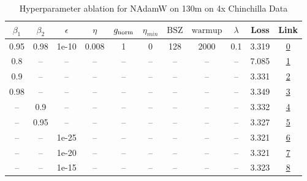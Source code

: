 \begin{table}[H]
\centering
\caption{Hyperparameter ablation for NAdamW on 130m on 4x Chinchilla Data}
\label{tab:ablation_nadamw_130m_on_4x_chinchilla_data}
\begin{tabular}{ccccccccccc}
\toprule
$\beta_1$ & $\beta_2$ & $\epsilon$ & $\eta$ & $g_{\mathrm{norm}}$ & $\eta_{min}$ & $\mathrm{BSZ}$ & $\mathrm{warmup}$ & $\lambda$ & Loss & Link \\
\midrule
0.95 & 0.98 & 1e-10 & 0.008 & 1 & 0 & 128 & 2000 & 0.1 & 3.319 & \href{https://wandb.ai/marin-community/optimizer-scaling/runs/sweep-130m-10B-nadamwaee88elr0.008-wd0.1-minlr0-warmup2000-b10.9-75fe1d}{0} \\
\midrule
0.8 & -- & -- & -- & -- & -- & -- & -- & -- & 7.085 & \href{https://wandb.ai/marin-community/optimizer-scaling/runs/sweep-130m-10B-nadamw3ae24elr0.008-wd0.1-minlr0-warmup2000-b10.8-cd4bbc}{1} \\
0.9 & -- & -- & -- & -- & -- & -- & -- & -- & 3.331 & \href{https://wandb.ai/marin-community/optimizer-scaling/runs/sweep-130m-10B-nadamw7ebd66lr0.008-wd0.1-minlr0-warmup2000-b10.9-359641}{2} \\
0.98 & -- & -- & -- & -- & -- & -- & -- & -- & 3.349 & \href{https://wandb.ai/marin-community/optimizer-scaling/runs/sweep-130m-10B-nadamwc3eccalr0.008-wd0.1-minlr0-warmup2000-b10.9-3589de}{3} \\
-- & 0.9 & -- & -- & -- & -- & -- & -- & -- & 3.332 & \href{https://wandb.ai/marin-community/optimizer-scaling/runs/sweep-130m-10B-nadamw0503eblr0.008-wd0.1-minlr0-warmup2000-b10.9-77f1a7}{4} \\
-- & 0.95 & -- & -- & -- & -- & -- & -- & -- & 3.327 & \href{https://wandb.ai/marin-community/optimizer-scaling/runs/sweep-130m-10B-nadamwa45c4blr0.008-wd0.1-minlr0-warmup2000-b10.9-8bcacb}{5} \\
-- & -- & 1e-25 & -- & -- & -- & -- & -- & -- & 3.321 & \href{https://wandb.ai/marin-community/optimizer-scaling/runs/sweep-130m-10B-nadamw23255flr0.008-wd0.1-minlr0-warmup2000-b10.9-5c4387}{6} \\
-- & -- & 1e-20 & -- & -- & -- & -- & -- & -- & 3.321 & \href{https://wandb.ai/marin-community/optimizer-scaling/runs/sweep-130m-10B-nadamweddb28lr0.008-wd0.1-minlr0-warmup2000-b10.9-74d910}{7} \\
-- & -- & 1e-15 & -- & -- & -- & -- & -- & -- & 3.323 & \href{https://wandb.ai/marin-community/optimizer-scaling/runs/sweep-130m-10B-nadamwb0fef6lr0.008-wd0.1-minlr0-warmup2000-b10.9-4497ae}{8} \\

\end{tabular}
\end{table}

